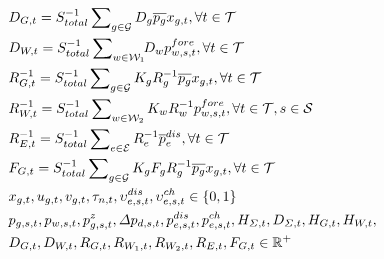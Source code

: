 \documentclass[lettersize,journal]{IEEEtran}
\newenvironment{newsubequations}{\small\begin{subequations}}{\end{subequations}}
\begin{document}
\begin{newsubequations}
\begin{align}
& D_{G,t} =  S_{total}^{-1} \sum\nolimits_{g \in\mathcal{G}}D_{g}\overline{p_{g}} x_{g,t},\forall t\in\mathcal{T} \label{19-m} \\
& D_{W,t} =  S_{total}^{-1} \sum\nolimits_{w \in\mathcal{W}_1} \!\! D_{w} p_{w,s,t}^{fore} , \forall t\in\mathcal{T} \label{19-n}\\
& R_{G,t}^{-1} =  S_{total}^{-1} \sum\nolimits_{g\in\mathcal{G}} {K_{g}}{R_{g}^{-1}}\overline{p_{g}} x_{g,t}, \forall t\in\mathcal{T}  \label{19-o}\\
& R_{W,t}^{-1} =  S_{total}^{-1} \sum\nolimits_{w\in\mathcal{W}_{2}} {K_{w}}{R_{w}^{-1}} p_{w,s,t}^{fore},  \forall t\in\mathcal{T}, s\in\mathcal{S}  \label{19-p}\\
& R_{E,t}^{-1} =  S_{total}^{-1} \sum\nolimits_{e\in\mathcal{E}} {R_{e}^{-1}} \overline{p}_{e}^{dis}, \forall t\in\mathcal{T} \label{19-q}\\
& F_{G,t} = S_{total}^{-1} \sum\nolimits_{g \in\mathcal{G}} {K_{g}F_{g}}{R_{g}^{-1}} \overline{p_{g}} x_{g,t}, \forall t\in\mathcal{T} \label{19-r}
\\
&x_{g,t},u_{g,t},v_{g,t},\tau_{n,t},\upsilon_{e,s,t}^{{dis}},\upsilon_{e,s,t}^{{ch}}\in \{0,1\}\label{19-s}\\
&p_{g,s,t}, p_{w,s,t},p_{g,s,t}^{z}, \varDelta p_{d,s,t}, p_{e,s,t}^{{dis}}, p_{e,s,t}^{{ch}},H_{\varSigma,t},D_{\varSigma,t},H_{G,t},H_{W,t},\notag\\
&D_{G,t},D_{W,t},R_{G,t},R_{W_1,t},R_{W_2,t},R_{E,t},F_{G,t} \in\mathbb{R}^{+}  \label{19-t}
\end{align} \end{newsubequations}
\vspace{-0.125in}
\end{document}
